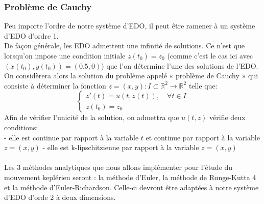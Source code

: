 \documentclass[11pt]{article} %
\newcommand \tab[1][1cm]{\hspace*{#1}}
\begin{document}
\subsubsection{Problème de Cauchy}
Peu importe l'ordre de notre système d'EDO, il peut être ramener à un système d'EDO d'ordre 1. \\
De façon générale, les EDO admettent une infinité de solutions. Ce n’est que lorsqu’on impose une condition initiale $z(t_0)=z_0$ (comme c'est le cas ici avec $(x(t_0),y(t_0)) = (0.5 , 0)$) que l’on détermine l’une des solutions de l’EDO. On considèrera alors la solution du problème appelé « problème de Cauchy » qui consiste à déterminer la fonction $z=(x,y) : I \subset \mathbb{R}^2 \to \mathbb{R}^2$  telle que:
\begin{equation}
\begin{cases} z'(t) = u(t,z(t)), \quad \forall t \in I\\ z(t_0)=z_0 \end{cases}
\end{equation}
Afin de vérifier l'unicité de la solution, on admettra que $u(t,z)$ vérifie deux conditions:\\
\tab - elle est continue par rapport à la variable $t$ et continue par rapport à la variable $z=(x,y)$
\tab - elle est k-lipschitzienne par rapport à la variable $z = (x,y)$
\\\\
Les 3 méthodes analytiques que nous allons implémenter pour l'étude du mouvement keplérien seront : la méthode d'Euler, la méthode de Runge-Kutta 4 et la méthode d'Euler-Richardson. Celle-ci devront être adaptées à notre système d'EDO d'orde 2 à deux dimensions.\\
\end{document}
